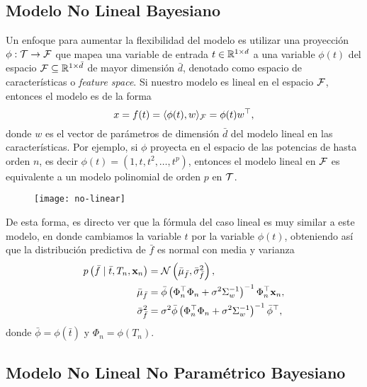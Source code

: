 \subsection{Modelo No Lineal Bayesiano}

Un enfoque para aumentar la flexibilidad del modelo es utilizar una proyección \(\phi : \mathcal{T} \to \mathcal{F}\) que mapea una variable de entrada \(t \in \mathbb{R}^{1 \times d}\) a una variable \(\phi(t)\) del espacio \(\mathcal{F} \subseteq \mathbb{R}^{1 \times \bar{d}}\) de mayor dimensión \(\bar{d}\), denotado como espacio de características o \emph{feature space}. Si nuestro modelo es lineal en el espacio \(\mathcal{F}\), entonces el modelo es de la forma
\begin{equation*}
	x = f(t) = \langle \phi(t), w \rangle_{\mathcal{F}} = \phi(t) w^{\top},
\end{equation*}
donde \(w\) es el vector de parámetros de dimensión \(\bar{d}\) del modelo lineal en las características. Por ejemplo, si \(\phi\) proyecta en el espacio de las potencias de hasta orden \(n\), es decir \(\phi(t) = (1, t, t^2, \dotsc, t^p)\), entonces el modelo lineal en \(\mathcal{F}\) es equivalente a un modelo polinomial de orden \(p\) en \(\mathcal{T}\).
\begin{figure}[h]
	\centering
	\texttt{[image: no-linear]}
\end{figure}

De esta forma, es directo ver que la fórmula del caso lineal es muy similar a este modelo, en donde cambiamos la variable \(t\) por la variable \(\phi(t)\), obteniendo así que la distribución predictiva de \(\bar{f}\) es normal con media y varianza
\begin{align*}
	p \left(\bar{f} \mid \bar{t}, T_n, \mathbf{x}_n\right)	&= \mathcal{N} \left(\bar{\mu}_{\bar{f}}, \bar{\sigma}_{\bar{f}}^2\right),\\
	\bar{\mu}_{\bar{f}}									&= \bar{\phi} \left(\Phi_n^{\top} \Phi_n + \sigma^2 \Sigma_w^{-1}\right)^{-1} \Phi_n^{\top} \mathbf{x}_n,\\
	\bar{\sigma}_{\bar{f}}^2							&= \sigma^2 \bar{\phi} \left(\Phi_n^{\top} \Phi_n + \sigma^2 \Sigma_w^{-1} \right)^{-1} \bar{\phi}^{\top},\\
\end{align*}
donde \(\bar{\phi} = \phi(\bar{t})\) y \(\Phi_n = \phi(T_n)\).

\subsection{Modelo No Lineal No Paramétrico Bayesiano}

